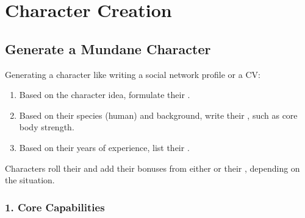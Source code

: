 \documentclass{LegrandOrangeTufteBook}
\begin{document}
\chapterspaceabove{2.75cm}
\chapterspacebelow{5.25cm}


\chapter*{Character Creation}

\section*{Generate a Mundane Character}

Generating a character like writing a social network profile or a CV:
\begin{enumerate}
	\item Based on the character idea, formulate their .
	\item Based on their species (human) and background, write their , such as core body strength.
	\item Based on their years of experience, list their .
\end{enumerate}
Characters roll their  and
add their bonuses from either  or their ,
depending on the situation.

\subsection*{1. Core Capabilities}


\end{document}

